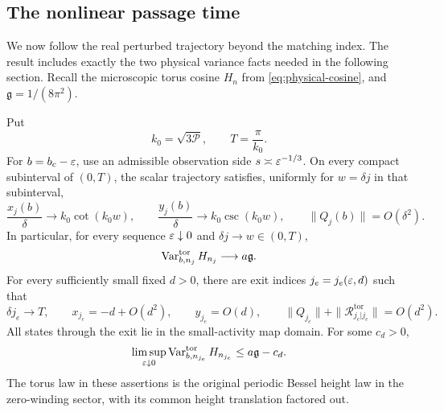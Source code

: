 \subsection{The nonlinear passage time}

We now follow the real perturbed trajectory beyond the matching
index.  The result includes exactly the two physical variance facts
needed in the following section.  Recall the microscopic torus
cosine \(H_n\) from \eqref{eq:physical-cosine}, and
\(\mathfrak g=1/(8\pi^2)\).

\begin{proposition}
\label{prop:passage}
Put
\[
 k_0=\sqrt{3\mathcal P},\qquad T=\frac\pi{k_0}.
\]
For \(b=b_c-\varepsilon\), use an admissible observation side
\(s\asymp\varepsilon^{-1/3}\).  On every compact subinterval of
\((0,T)\), the scalar trajectory satisfies, uniformly for
\(w=\delta j\) in that subinterval,
\begin{equation}\label{eq:traj-scaled-limit}
 \frac{x_j(b)}\delta\longrightarrow k_0\cot(k_0w),
 \qquad
 \frac{y_j(b)}\delta\longrightarrow k_0\csc(k_0w),
 \qquad \|Q_j(b)\|=O(\delta^2).
\end{equation}
In particular, for every sequence \(\varepsilon\downarrow0\) and
\(\delta j\to w\in(0,T)\),
\begin{equation}\label{eq:traj-before-variance}
                \operatorname{Var}_{b,n_j}^{\mathrm{tor}}H_{n_j}
                       \longrightarrow a\mathfrak g.
\end{equation}
For every sufficiently small fixed \(d>0\), there are exit indices
\(j_e=j_e(\varepsilon,d)\) such that
\begin{equation}\label{eq:traj-exit}
 \delta j_e\longrightarrow T,\qquad
 x_{j_e}=-d+O(d^2),\qquad y_{j_e}=O(d),\qquad
 \|Q_{j_e}\|+\|\mathcal R_{j_e|j_e}^{\mathrm{tor}}\|=O(d^2).
\end{equation}
All states through the exit lie in the small-activity map domain.
For some \(c_d>0\),
\begin{equation}\label{eq:traj-exit-variance}
 \limsup_{\varepsilon\downarrow0}
       \operatorname{Var}_{b,n_{j_e}}^{\mathrm{tor}}H_{n_{j_e}}
                 \le a\mathfrak g-c_d.
\end{equation}
The torus law in these assertions is the original periodic Bessel
height law in the zero-winding sector, with its common height
translation factored out.
\end{proposition}

